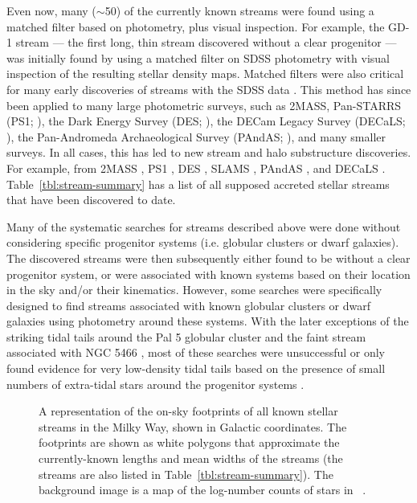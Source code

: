 \documentclass[final,5p,times,twocolumn,authoryear]{elsarticle}
\begin{document}
Even now, many ($\sim$50) of the currently known streams were found using a matched
filter based on photometry, plus visual inspection.
For example, the GD-1 stream --- the first long, thin stream discovered without a clear
progenitor --- was initially found by \citet{Grillmair:2006-gd1} using a matched filter
on SDSS photometry with visual inspection of the resulting stellar density maps.
Matched filters were also critical for many early discoveries of streams with the SDSS
data \citep[e.g.,][]{Newberg:2002, Yanny:2003, Belokurov:2006, Grillmair:2006-orphan}.
This method has since been applied to many large photometric surveys, such as 2MASS,
Pan-STARRS (PS1; \citealt{chambers:2016}), the Dark Energy Survey (DES;
\citealt{des:2005, des:2016}), the DECam Legacy Survey  (DECaLS; \citealt{dey:2019}),
the Pan-Andromeda Archaeological Survey (PAndAS; \citealt{mcconnachie:2009}),
and many smaller surveys.
In all cases, this has led to new stream and halo substructure discoveries.
For example, from 2MASS \citep{rocha-pinto:2003, rocha-pinto:2004}, PS1
\citep{bernard:2014, bernard:2016, navarrete:2017}, DES \citep{shipp:2018}, SLAMS
\citep{jethwa:2018}, PAndAS \citep{martin:2014}, and DECaLS \citep{shipp:2020}.
Table~\ref{tbl:stream-summary} has a list of all supposed accreted stellar streams that
have been discovered to date.

Many of the systematic searches for streams described above were done without
considering specific progenitor systems (i.e. globular clusters or dwarf galaxies).
The discovered streams were then subsequently either found to be without a clear
progenitor system, or were associated with known systems based on their location in the
sky and/or their kinematics.
However, some searches were specifically designed to find streams associated with known
globular clusters or dwarf galaxies \citep[e.g.,][]{grillmair:1995, kuhn:1996,
leon:2000} using photometry around these systems.
With the later exceptions of the striking tidal tails around the Pal 5 globular cluster
\citep{odenkirchen:2001} and the faint stream associated with NGC 5466
\citep{Grillmair:2006-ngc5466}, most of these searches were unsuccessful or only found
evidence for very low-density tidal tails based on the presence of small numbers of
extra-tidal stars around the progenitor systems \citep{grillmair:1995, leon:2000}.

\begin{figure}[t!]
\begin{center}
\end{center}
\caption{%
A representation of the on-sky footprints of all known stellar streams in the Milky Way,
shown in Galactic coordinates.
The footprints are shown as white polygons that approximate the currently-known lengths
and mean widths of the streams (the streams are also listed in
Table~\ref{tbl:stream-summary}).
The background image is a map of the log-number counts of stars in \gaia\ .
\label{fig:sky-map}
}
\end{figure}
\end{document}
